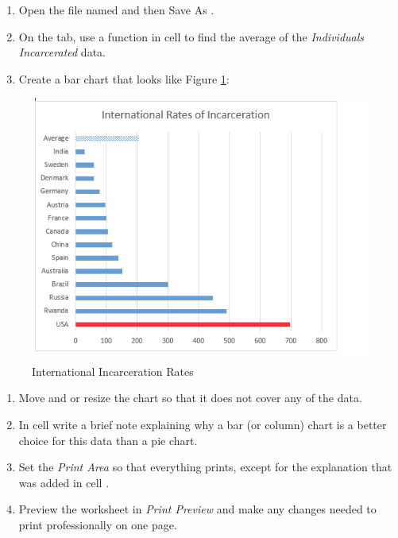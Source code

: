 \begin{enumerate}
	\item Open the file named  and then Save As .
	\item On the  tab, use a function in cell  to find the average of the \textit{Individuals Incarcerated} data.
	\item Create a bar chart that looks like Figure \ref{04:fig56}:
\end{enumerate}

\begin{figure}[H]
	\centering
	\includegraphics[width=\maxwidth{.95\linewidth}]{gfx/ch04_fig56}
	\caption{International Incarceration Rates}
	\label{04:fig56}
\end{figure}

\begin{enumerate}
	\item Move and or resize the chart so that it does not cover any of the data.
	\item In cell  write a brief note explaining why a bar (or column) chart is a better choice for this data than a pie chart.
	\item Set the \textit{Print Area} so that everything prints, except for the explanation that was added in cell .
	\item Preview the  worksheet in \textit{Print Preview} and make any changes needed to print professionally on one page.
\end{enumerate}

